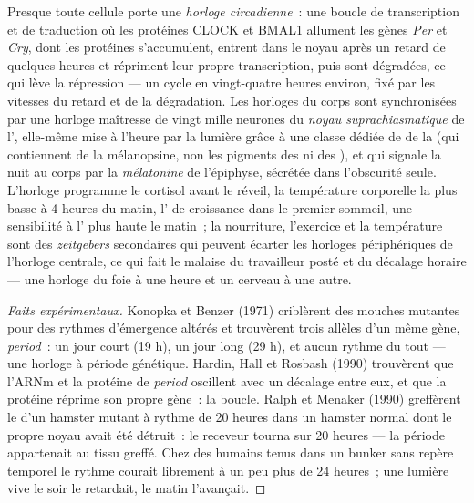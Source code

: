 \begin{definition}\label{def:b3:endocrinology:clock}
Presque toute cellule porte une \emph{horloge circadienne}~: une boucle
de transcription et de traduction où les protéines CLOCK et BMAL1
allument les gènes \emph{Per} et \emph{Cry}, dont les protéines
s'accumulent, entrent dans le noyau après un retard de quelques heures
et répriment leur propre transcription, puis sont dégradées, ce qui lève
la répression --- un cycle en vingt-quatre heures environ, fixé par les
vitesses du retard et de la dégradation. Les horloges du corps sont
synchronisées par une horloge maîtresse de vingt mille neurones du
\emph{noyau suprachiasmatique} de l', elle-même mise à
l'heure par la lumière grâce à une classe dédiée de  de la  (qui contiennent de la mélanopsine, non les
pigments des  ni des ), et qui signale la nuit au corps
par la \emph{mélatonine} de l'épiphyse, sécrétée dans l'obscurité seule.
L'horloge programme le cortisol avant le réveil, la température
corporelle la plus basse à 4 heures du matin, l' de croissance
dans le premier sommeil, une sensibilité à l' plus haute le
matin~; la nourriture, l'exercice et la température sont des
\emph{zeitgebers} secondaires qui peuvent écarter les horloges
périphériques de l'horloge centrale, ce qui fait le malaise du
travailleur posté et du décalage horaire --- une horloge du foie à une
heure et un cerveau à une autre.
\end{definition}

\begin{proof}[Faits expérimentaux]
Konopka et Benzer (1971) criblèrent des mouches mutantes pour des
rythmes d'émergence altérés et trouvèrent trois allèles d'un même gène,
\emph{period}~: un jour court (19 h), un jour long (29 h), et aucun
rythme du tout --- une horloge à période génétique. Hardin, Hall et
Rosbash (1990) trouvèrent que l'ARNm et la protéine de \emph{period}
oscillent avec un décalage entre eux, et que la protéine réprime son
propre gène~: la boucle. Ralph et Menaker (1990) greffèrent le  d'un hamster mutant à rythme de 20 heures dans un
hamster normal dont le propre noyau avait été détruit~: le receveur
tourna sur 20 heures --- la période appartenait au tissu greffé. Chez
des humains tenus dans un bunker sans repère temporel le rythme courait
librement à un peu plus de 24 heures~; une lumière vive le soir le
retardait, le matin l'avançait.
\end{proof}

